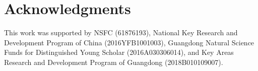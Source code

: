 \documentclass[sigconf]{acmart}
\begin{document}
\section*{Acknowledgments}
This work was supported by NSFC (61876193), National Key Research and Development Program of China (2016YFB1001003), Guangdong Natural Science Funds for Distinguished Young Scholar (2016A030306014), and Key Areas Research and Development Program of Guangdong (2018B010109007).





\end{document}

